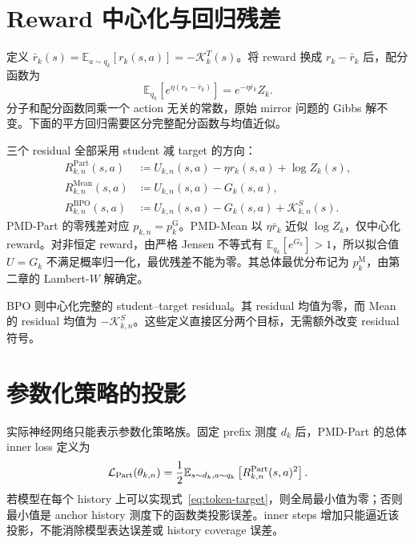 \section{Reward 中心化与回归残差}

定义 $\bar r_k(s)=\mathbb E_{a\sim q_k}[r_k(s,a)]=-\mathcal K_k^T(s)$。将 reward 换成 $r_k-\bar r_k$ 后，配分函数为
\begin{equation*}
\mathbb E_{ q_k}[e^{\eta(r_k-\bar r_k)}]=e^{-\eta\bar r_k}Z_k.
\end{equation*}
分子和配分函数同乘一个 action 无关的常数，原始 mirror 问题的 Gibbs 解不变。下面的平方回归需要区分完整配分函数与均值近似。

三个 residual 全部采用 student 减 target 的方向：
\begin{align}
R^{\mathrm{Part}}_{k,n}(s,a)&\coloneqq U_{k,n}(s,a)-\eta r_k(s,a)+\log Z_k(s),\label{eq:part-residual}\\
R^{\mathrm{Mean}}_{k,n}(s,a)&\coloneqq U_{k,n}(s,a)-G_k(s,a),\label{eq:mean-residual}\\
R^{\mathrm{BPO}}_{k,n}(s,a)&\coloneqq U_{k,n}(s,a)-G_k(s,a)+\mathcal K_{k,n}^S(s).
\end{align}
PMD-Part 的零残差对应 $ p_{k,n}= p_k^{\mathrm G}$。PMD-Mean 以 $\eta\bar r_k$ 近似 $\log Z_k$，仅中心化 reward。对非恒定 reward，由严格 Jensen 不等式有 $\mathbb E_{ q_k}[e^{G_k}]>1$，所以拟合值 $U=G_k$ 不满足概率归一化，最优残差不能为零。其总体最优分布记为 $ p_k^{\mathrm M}$，由第二章的 Lambert-$W$ 解确定。

BPO 则中心化完整的 student--target residual。其 residual 均值为零，而 Mean 的 residual 均值为 $-\mathcal K_{k,n}^S$。这些定义直接区分两个目标，无需额外改变 residual 符号。

\section{参数化策略的投影}

实际神经网络只能表示参数化策略族。固定 prefix 测度 $d_k$ 后，PMD-Part 的总体 inner loss 定义为
\begin{equation}\label{eq:part-loss}
 \mathcal L_{\mathrm{Part}}(\theta_{k,n})
 =\frac12\mathbb E_{s\sim d_k,a\sim q_k}
 \left[R^{\mathrm{Part}}_{k,n}(s,a)^2\right].
\end{equation}
若模型在每个 history 上可以实现式~\eqref{eq:token-target}，则全局最小值为零；否则最小值是 anchor history 测度下的函数类投影误差。inner steps 增加只能逼近该投影，不能消除模型表达误差或 history coverage 误差。
